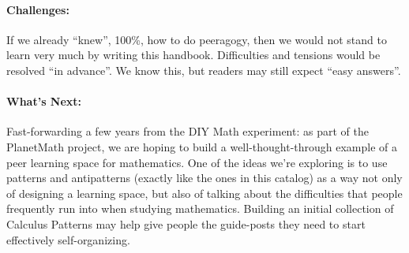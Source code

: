 \paragraph{Challenges:} If we already ``knew'', 100\%, how to do peeragogy,
then we would not stand to learn very much by writing this handbook.
Difficulties and tensions would be resolved ``in advance''. We know
this, but readers may still expect ``easy answers''.

\paragraph{What's Next:} Fast-forwarding a few years from the DIY Math
experiment: as part of the PlanetMath project, we are hoping to build a
well-thought-through example of a peer learning space for mathematics.
One of the ideas we're exploring is to use patterns and antipatterns
(exactly like the ones in this catalog) as a way not only of designing a
learning space, but also of talking about the difficulties that people
frequently run into when studying mathematics. Building an initial
collection of Calculus Patterns may help give people the guide-posts
they need to start effectively self-organizing.


